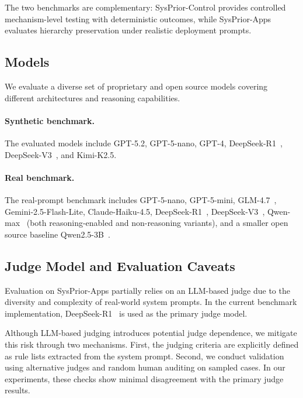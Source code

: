 \documentclass{article}
\newcommand{\ihbenchs}{SysPrior-Control}
\newcommand{\ihbenchr}{SysPrior-Apps}
\begin{document}
The two benchmarks are complementary: \ihbenchs{} provides controlled mechanism-level testing with deterministic outcomes, while \ihbenchr{} evaluates hierarchy preservation under realistic deployment prompts.

\subsection{Models}

We evaluate a diverse set of proprietary and open source models covering different architectures and reasoning capabilities.

\paragraph{Synthetic benchmark.}
The evaluated models include GPT-5.2, GPT-5-nano, GPT-4, DeepSeek-R1~\cite{deepseek2025r1}, DeepSeek-V3~\cite{deepseek2024v3}, and Kimi-K2.5.

\paragraph{Real benchmark.}
The real-prompt benchmark includes GPT-5-nano, GPT-5-mini, GLM-4.7~\cite{glm2024chatglm}, Gemini-2.5-Flash-Lite, Claude-Haiku-4.5, DeepSeek-R1~\cite{deepseek2025r1}, DeepSeek-V3~\cite{deepseek2024v3}, Qwen-max~\cite{qwen2024qwen25} (both reasoning-enabled and non-reasoning variants), and a smaller open source baseline Qwen2.5-3B~\cite{qwen2024qwen25}.


\subsection{Judge Model and Evaluation Caveats}

Evaluation on \ihbenchr{} partially relies on an LLM-based judge due to the diversity and complexity of real-world system prompts. In the current benchmark implementation, DeepSeek-R1~\cite{deepseek2025r1} is used as the primary judge model.

Although LLM-based judging introduces potential judge dependence, we mitigate this risk through two mechanisms. First, the judging criteria are explicitly defined as rule lists extracted from the system prompt. Second, we conduct validation using alternative judges and random human auditing on sampled cases. In our experiments, these checks show minimal disagreement with the primary judge results.
\end{document}
